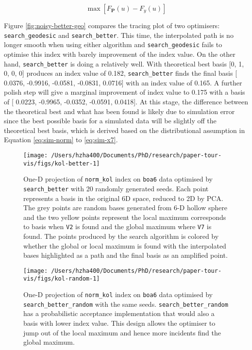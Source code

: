 \documentclass[12pt]{article}
\begin{document}
\[\max \left[F_{\mathbf{P}}(u) - F_{y}(u)\right]\]

Figure \ref{fig:noisy-better-geo} compares the tracing plot of two optimisers: \texttt{search\_geodesic} and \texttt{search\_better}. This time, the interpolated path is no longer smooth when using either algorithm and \texttt{search\_geodesic} fails to optimise this index with barely improvement of the index value. On the other hand, \texttt{search\_better} is doing a relatively well. With theoretical best basis {[}0, 1, 0, 0, 0{]} produces an index value of 0.182, \texttt{search\_better} finds the final basis {[} 0.0376, -0.9916, -0.0581, -0.0831, 0.0716{]} with an index value of 0.165. A further polish step will give a marginal improvement of index value to 0.175 with a basis of {[} 0.0223, -0.9965, -0.0352, -0.0591, 0.0418{]}. At this stage, the difference between the theoretical best and what has been found is likely due to simulation error since the best possible basis for a simulated data will be slightly off the theoretical best basis, which is derived based on the distributional assumption in Equation \ref{eq:sim-norm} to \ref{eq:sim-x7}.

\begin{figure}

{\centering \texttt{[image: /Users/hzha400/Documents/PhD/research/paper-tour-vis/figs/kol-better-1]} 

}

\caption{One-D projection of \texttt{norm\_kol} index on \texttt{boa6} data optimised by \texttt{search\_better} with 20 randomly generated seeds. Each point represents a basis in the original 6D space, reduced to 2D by PCA. The grey points are random bases generated from 6-D hollow sphere and the two yellow points represent the local maximum corresponds to basis when \texttt{V2} is found and the global maximum where \texttt{V7} is found. The points produced by the search algorithm is colored by whether the global or local maximum is found with the interpolated bases highlighted as a path and the final basis as an amplified point.}\label{fig:kol-better}
\end{figure}



\begin{figure}

{\centering \texttt{[image: /Users/hzha400/Documents/PhD/research/paper-tour-vis/figs/kol-random-1]} 

}

\caption{One-D projection of \texttt{norm\_kol} index on \texttt{boa6} data optimised by \texttt{search\_better\_random} with the same seeds. \texttt{search\_better\_random} has a probabilistic acceptance implementation that would also a basis with lower index value. This design allows the optimiser to jump out of the local maximum and hence more incidents find the global maximum.}\label{fig:kol-random}
\end{figure}
\end{document}
